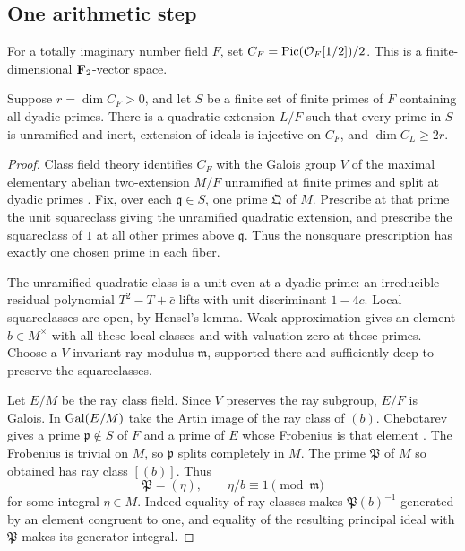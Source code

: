 \subsection{One arithmetic step}
For a totally imaginary number field $F$, set
$C_F=\operatorname{Pic}(\mathcal O_F[1/2])/2$. This is a finite-dimensional
$\mathbf F_2$-vector space.

\begin{lemma}\label{lem:step}
Suppose $r=\dim C_F>0$, and let $S$ be a finite set of finite
primes of $F$ containing all dyadic primes. There is a quadratic
extension $L/F$ such that every prime in $S$ is unramified and
inert, extension of ideals is injective on $C_F$, and
$\dim C_L\ge2r$.
\end{lemma}
\begin{proof}
Class field theory identifies $C_F$ with the Galois group $V$ of
the maximal elementary abelian two-extension $M/F$ unramified at
finite primes and split at dyadic primes
\cite[Chapter V, Theorems 3.5--3.6, p.~158]{MilneCFT}. Fix, over
each $\mathfrak q\in S$, one prime $\mathfrak Q$ of $M$. Prescribe
at that prime the unit squareclass giving the unramified quadratic
extension, and prescribe the squareclass of $1$ at all other
primes above $\mathfrak q$. Thus the nonsquare prescription has exactly
one chosen prime in each fiber.

The unramified quadratic class is a unit even at a dyadic prime:
an irreducible residual polynomial $T^2-T+\bar c$ lifts with
unit discriminant $1-4c$. Local squareclasses are open, by
Hensel's lemma. Weak approximation gives an element $b\in M^\times$
with all these local classes and with valuation zero at those
primes. Choose a $V$-invariant ray modulus $\mathfrak m$, supported
there and sufficiently deep to preserve the squareclasses.

Let $E/M$ be the ray class field. Since $V$ preserves the ray
subgroup, $E/F$ is Galois. In $\operatorname{Gal}(E/M)$ take the Artin image
of the ray class of $(b)$. Chebotarev gives a prime
$\mathfrak p\notin S$ of $F$ and a prime of $E$ whose Frobenius
is that element \cite[Chapter V, Theorem 3.23, p.~164]{MilneCFT}.
The Frobenius is trivial on $M$, so $\mathfrak p$ splits completely
in $M$. The prime $\mathfrak P$ of $M$ so obtained has ray class
$[(b)]$. Thus
\[
 \mathfrak P=(\eta),\qquad \eta/b\equiv1\pmod{\mathfrak m}
\]
for some integral $\eta\in M$. Indeed equality of ray classes
makes $\mathfrak P(b)^{-1}$ generated by an element congruent to
one, and equality of the resulting principal ideal with
$\mathfrak P$ makes its generator integral.


\end{proof}

